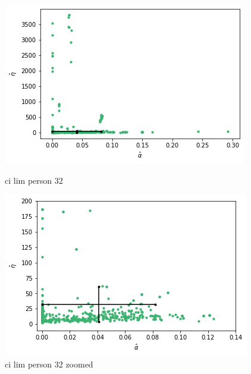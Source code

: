 \begin{figure}
    \centering
    \begin{minipage}{0.48\textwidth}
        \centering
        \includegraphics[scale=0.37]{pictures/ci_lim_a_e_person32.png}
        \caption{ci lim person 32}
        \label{fig:ci_lim_a_e_person_32}
    \end{minipage}\hfill
    \begin{minipage}{0.48\textwidth}
        \centering
        \includegraphics[scale=0.37]{pictures/ci_lim_a_e_person32_zoomed.png}
        \caption{ci lim person 32 zoomed}
        \label{fig:ci_lim_a_e_person_32_zoomed}
    \end{minipage}
\end{figure}


